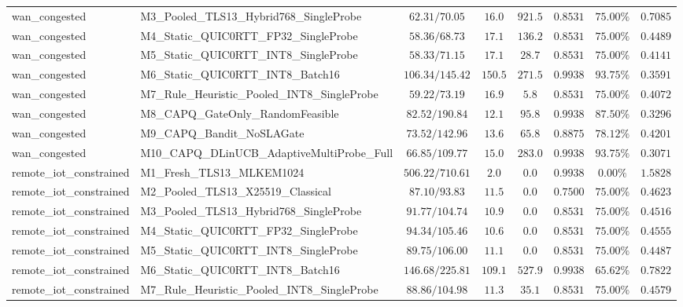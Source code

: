 \documentclass[10pt,journal,compsoc]{IEEEtran}
\begin{document}
\begin{table}[!t]
\begin{adjustbox}{max width=\textwidth}
\begin{tabular}{@{}llcccccc@{}}
wan\_congested & M3\_Pooled\_TLS13\_Hybrid768\_SingleProbe & $62.31 / 70.05$ & $16.0$ & $921.5$ & $0.8531$ & $75.00\%$ & $0.7085$ \\
wan\_congested & M4\_Static\_QUIC0RTT\_FP32\_SingleProbe & $58.36 / 68.73$ & $17.1$ & $136.2$ & $0.8531$ & $75.00\%$ & $0.4489$ \\
wan\_congested & M5\_Static\_QUIC0RTT\_INT8\_SingleProbe & $58.33 / 71.15$ & $17.1$ & $28.7$ & $0.8531$ & $75.00\%$ & $0.4141$ \\
wan\_congested & M6\_Static\_QUIC0RTT\_INT8\_Batch16 & $106.34 / 145.42$ & $150.5$ & $271.5$ & $0.9938$ & $93.75\%$ & $0.3591$ \\
wan\_congested & M7\_Rule\_Heuristic\_Pooled\_INT8\_SingleProbe & $59.22 / 73.19$ & $16.9$ & $5.8$ & $0.8531$ & $75.00\%$ & $0.4072$ \\
wan\_congested & M8\_CAPQ\_GateOnly\_RandomFeasible & $82.52 / 190.84$ & $12.1$ & $95.8$ & $0.9938$ & $87.50\%$ & $0.3296$ \\
wan\_congested & M9\_CAPQ\_Bandit\_NoSLAGate & $73.52 / 142.96$ & $13.6$ & $65.8$ & $0.8875$ & $78.12\%$ & $0.4201$ \\
wan\_congested & M10\_CAPQ\_DLinUCB\_AdaptiveMultiProbe\_Full & $66.85 / 109.77$ & $15.0$ & $283.0$ & $0.9938$ & $93.75\%$ & $0.3071$ \\
remote\_iot\_constrained & M1\_Fresh\_TLS13\_MLKEM1024 & $506.22 / 710.61$ & $2.0$ & $0.0$ & $0.9938$ & $0.00\%$ & $1.5828$ \\
remote\_iot\_constrained & M2\_Pooled\_TLS13\_X25519\_Classical & $87.10 / 93.83$ & $11.5$ & $0.0$ & $0.7500$ & $75.00\%$ & $0.4623$ \\
remote\_iot\_constrained & M3\_Pooled\_TLS13\_Hybrid768\_SingleProbe & $91.77 / 104.74$ & $10.9$ & $0.0$ & $0.8531$ & $75.00\%$ & $0.4516$ \\
remote\_iot\_constrained & M4\_Static\_QUIC0RTT\_FP32\_SingleProbe & $94.34 / 105.46$ & $10.6$ & $0.0$ & $0.8531$ & $75.00\%$ & $0.4555$ \\
remote\_iot\_constrained & M5\_Static\_QUIC0RTT\_INT8\_SingleProbe & $89.75 / 106.00$ & $11.1$ & $0.0$ & $0.8531$ & $75.00\%$ & $0.4487$ \\
remote\_iot\_constrained & M6\_Static\_QUIC0RTT\_INT8\_Batch16 & $146.68 / 225.81$ & $109.1$ & $527.9$ & $0.9938$ & $65.62\%$ & $0.7822$ \\
remote\_iot\_constrained & M7\_Rule\_Heuristic\_Pooled\_INT8\_SingleProbe & $88.86 / 104.98$ & $11.3$ & $35.1$ & $0.8531$ & $75.00\%$ & $0.4579$ \\

\end{tabular}
\end{adjustbox}
\end{table}
\end{document}
